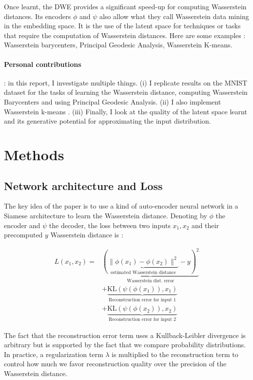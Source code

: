 \documentclass{article}
\begin{document}
Once learnt, the DWE provides a significant speed-up for computing Wasserstein distances. Its encoders $\phi$ and $\psi$ also allow what they call Wasserstein data mining in the embedding space. It is the use of the latent space for techniques or tasks that require the computation of Wasserstein distances. Here are some examples : Wasserstein barycenters, Principal Geodesic Analysis, Wasserstein K-means.



\paragraph{Personal contributions} : in this report, I investigate multiple things. (i) I replicate results on the MNIST dataset \cite{lecun-mnisthandwrittendigit-2010} for the tasks of learning the Wasserstein distance, computing Wasserstein Barycenters and using Principal Geodesic Analysis. (ii) I also implement Wasserstein k-means \cite{cuturi2014fast}. (iii) Finally, I look at the quality of the latent space learnt and its generative potential for approximating the input distribution.


\section{Methods}

\subsection{Network architecture and Loss}
The key idea of the paper is to use a kind of auto-encoder neural network in a Siamese architecture to learn the Wasserstein distance. Denoting by $\phi$ the encoder and $\psi$ the decoder, the loss between two inputs $x_1, x_2$ and their precomputed $y$ Wasserstein distance is :

\begin{align*}
L(x_1, x_2) =& \underbrace{(\underbrace{\| \phi(x_1) - \phi(x_2) \|^2}_{\textrm{estimated Wasserstein distance}} - y)^2}_{\textrm{Wasserstein dist. error}} \\ &+ \underbrace{\textrm{KL}(\psi(\phi(x_1)), x_1)}_{\textrm{Reconstruction error for input 1}} \\ &+ \underbrace{\textrm{KL}(\psi(\phi(x_2)), x_2)}_{\textrm{Reconstruction error for input 2}}
\end{align*}

The fact that the reconstruction error term uses a Kullback-Leibler divergence is arbitrary but is supported by the fact that we compare probability distributions. 
In practice, a regularization term $\lambda$ is multiplied to the reconstruction term to control how much we favor reconstruction quality over the precision of the Wasserstein distance. 
\end{document}
